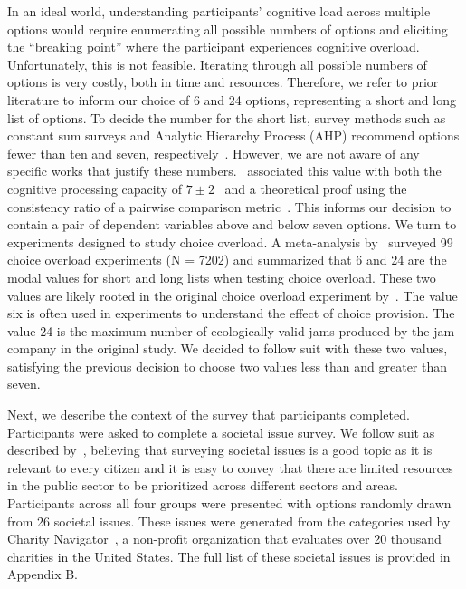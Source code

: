 In an ideal world, understanding participants' cognitive load across multiple options would require enumerating all possible numbers of options and eliciting the ``breaking point'' where the participant experiences cognitive overload. Unfortunately, this is not feasible. Iterating through all possible numbers of options is very costly, both in time and resources. Therefore, we refer to prior literature to inform our choice of 6 and 24 options, representing a short and long list of options. To decide the number for the short list, survey methods such as constant sum surveys and Analytic Hierarchy Process (AHP) recommend options fewer than ten and seven, respectively~\cite{moroneyQuestionnaireDesignHow2019, saatyGroupDecisionMaking2013, saatyPrinciplesAnalyticHierarchy1987}. However, we are not aware of any specific works that justify these numbers.~\textcite{saatyPrinciplesAnalyticHierarchy1987} associated this value with both the cognitive processing capacity of $7\pm2$~\cite{millerMagicalNumberSeven1956} and a theoretical proof using the consistency ratio of a pairwise comparison metric~\cite{saaty2003magic}. This informs our decision to contain a pair of dependent variables above and below seven options. We turn to experiments designed to study choice overload. A meta-analysis by~\textcite{chernevChoiceOverloadConceptual2015} surveyed 99 choice overload experiments (N = 7202) and summarized that 6 and 24 are the modal values for short and long lists when testing choice overload. These two values are likely rooted in the original choice overload experiment by~\textcite{iyengarWhenChoiceDemotivating2000}. The value six is often used in experiments to understand the effect of choice provision. The value 24 is the maximum number of ecologically valid jams produced by the jam company in the original study. We decided to follow suit with these two values, satisfying the previous decision to choose two values less than and greater than seven.

Next, we describe the context of the survey that participants completed. Participants were asked to complete a societal issue survey. We follow suit as described by~\textcite{chengCanShowWhat2021}, believing that surveying societal issues is a good topic as it is relevant to every citizen and it is easy to convey that there are limited resources in the public sector to be prioritized across different sectors and areas. Participants across all four groups were presented with options randomly drawn from 26 societal issues. These issues were generated from the categories used by Charity Navigator~\cite{CharityNavigatorAnimals2023}, a non-profit organization that evaluates over 20 thousand charities in the United States. The full list of these societal issues is provided in Appendix B.

